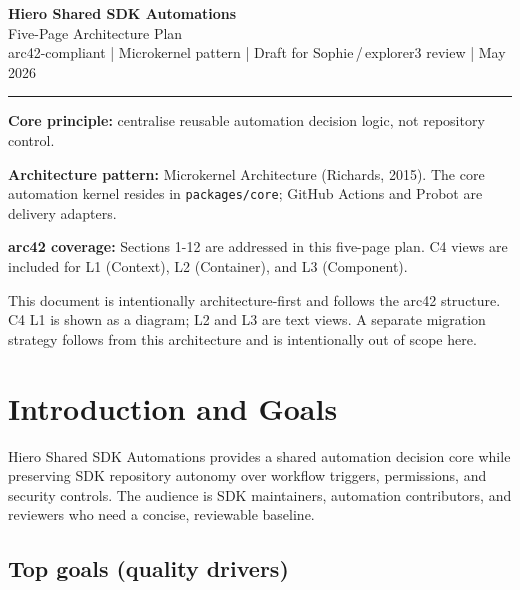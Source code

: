 \documentclass[10pt, a4paper]{article}
\begin{document}

\begin{center}
  {\LARGE\bfseries\color{hieroBlue} Hiero Shared SDK Automations}\\[6pt]
  {\large\color{hieroGray} Five-Page Architecture Plan}\\[4pt]
  {\small\color{hieroGray}
    arc42-compliant \quad|\quad
    Microkernel pattern \quad|\quad
    Draft for Sophie\,/\,explorer3 review \quad|\quad
    May 2026
  }
\end{center}

\vspace{4pt}
\color{hieroRule}\hrule\color{black}
\vspace{6pt}

\begin{notebox}
  \textbf{Core principle:} centralise reusable automation decision logic, not repository control.

  \textbf{Architecture pattern:} Microkernel Architecture (Richards, 2015). The core automation
  kernel resides in \texttt{packages/core}; GitHub Actions and Probot are delivery adapters.

  \textbf{arc42 coverage:} Sections 1-12 are addressed in this five-page plan. C4 views are
  included for L1 (Context), L2 (Container), and L3 (Component).
\end{notebox}

This document is intentionally architecture-first and follows the arc42 structure. C4 L1 is
shown as a diagram; L2 and L3 are text views. A separate migration strategy follows from this
architecture and is intentionally out of scope here.

\section{Introduction and Goals}

Hiero Shared SDK Automations provides a shared automation decision core while preserving SDK
repository autonomy over workflow triggers, permissions, and security controls. The audience is
SDK maintainers, automation contributors, and reviewers who need a concise, reviewable baseline.

\subsection{Top goals (quality drivers)}
\end{document}
